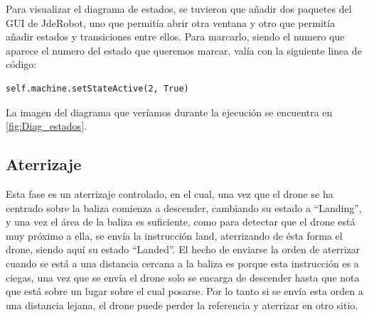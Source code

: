 \hspace{1cm} Para visualizar el diagrama de estados, se tuvieron que añadir dos paquetes del GUI de JdeRobot, uno que permit\'ia abrir otra ventana y otro que permit\'ia añadir estados y transiciones entre ellos. Para marcarlo, siendo el numero que aparece el numero del estado que queremos marcar, val\'ia con la siguiente linea de c\'odigo:

\begin{lstlisting}[backgroundcolor=\color{yellow}]
self.machine.setStateActive(2, True)
\end{lstlisting}
	
\hspace{1cm}La imagen del diagrama que ver\'iamos durante la ejecuci\'on se encuentra en \ref{fig:Diag_estados}.

\subsection{Aterrizaje}

\hspace{1 cm} Esta fase es un aterrizaje controlado, en el cual, una vez que el drone se ha centrado sobre la baliza comienza a descender, cambiando su estado a "`Landing"', y una vez el \'area de la baliza es suficiente, como para detectar que el drone est\'a muy pr\'oximo a ella, se env\'ia la instrucci\'on land, aterrizando de \'esta forma el drone, siendo aqu\'i su estado "`Landed"'. El hecho de enviarse la orden de aterrizar cuando se est\'a a una distancia cercana a la baliza es porque esta instrucci\'on es a ciegas, una vez que se env\'ia el drone solo se encarga de descender hasta que nota que est\'a sobre un lugar sobre el cual posarse. Por lo tanto si se env\'ia esta orden a una distancia lejana, el drone puede perder la referencia y aterrizar en otro sitio. 























